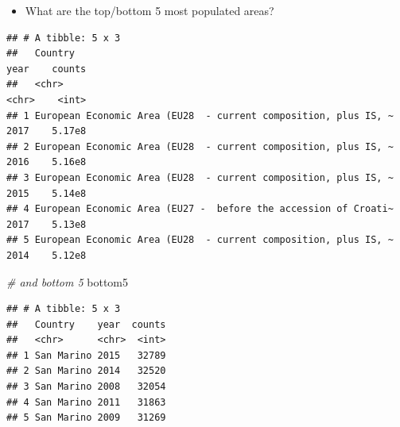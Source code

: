 \documentclass[]{book}
\newenvironment{Shaded}{\begin{snugshade}}{\end{snugshade}}
\newcommand{\KeywordTok}[1]{\textcolor[rgb]{0.13,0.29,0.53}{\textbf{#1}}}
\newcommand{\DecValTok}[1]{\textcolor[rgb]{0.00,0.00,0.81}{#1}}
\newcommand{\StringTok}[1]{\textcolor[rgb]{0.31,0.60,0.02}{#1}}
\newcommand{\CommentTok}[1]{\textcolor[rgb]{0.56,0.35,0.01}{\textit{#1}}}
\newcommand{\OperatorTok}[1]{\textcolor[rgb]{0.81,0.36,0.00}{\textbf{#1}}}
\newcommand{\NormalTok}[1]{#1}
\providecommand{\tightlist}{%
  \setlength{\itemsep}{0pt}\setlength{\parskip}{0pt}}
\begin{document}
\begin{itemize}
\tightlist
\item
  What are the top/bottom 5 most populated areas?
\end{itemize}

\begin{Shaded}
\end{Shaded}

\begin{verbatim}
## # A tibble: 5 x 3
##   Country                                                         year    counts
##   <chr>                                                           <chr>    <int>
## 1 European Economic Area (EU28  - current composition, plus IS, ~ 2017    5.17e8
## 2 European Economic Area (EU28  - current composition, plus IS, ~ 2016    5.16e8
## 3 European Economic Area (EU28  - current composition, plus IS, ~ 2015    5.14e8
## 4 European Economic Area (EU27 -  before the accession of Croati~ 2017    5.13e8
## 5 European Economic Area (EU28  - current composition, plus IS, ~ 2014    5.12e8
\end{verbatim}

\begin{Shaded}
\begin{Highlighting}[]
\CommentTok{# and bottom 5}
\NormalTok{bottom5}
\end{Highlighting}
\end{Shaded}

\begin{verbatim}
## # A tibble: 5 x 3
##   Country    year  counts
##   <chr>      <chr>  <int>
## 1 San Marino 2015   32789
## 2 San Marino 2014   32520
## 3 San Marino 2008   32054
## 4 San Marino 2011   31863
## 5 San Marino 2009   31269
\end{verbatim}
\end{document}
